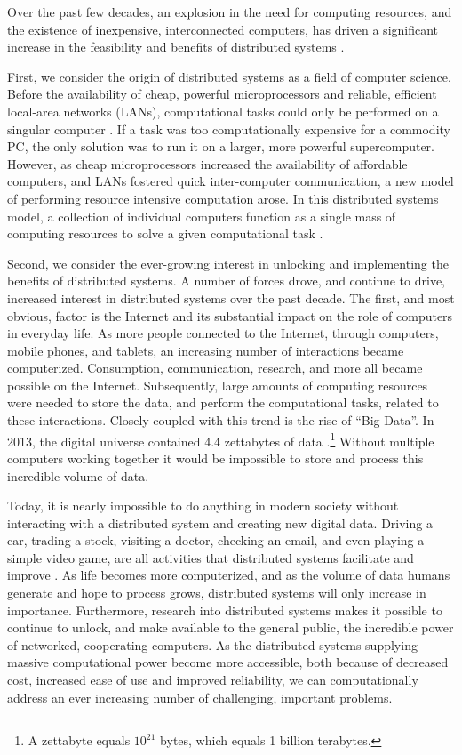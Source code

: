 Over the past few decades, an explosion in the need for computing resources,
and the existence of inexpensive, interconnected computers, has
driven a significant increase in the feasibility and benefits of distributed
systems \cite{distributed-systems-principles-and-paradigms}.

First, we consider the origin of distributed systems as a field of computer
science. Before the availability of cheap, powerful microprocessors and reliable,
efficient local-area networks (LANs), computational tasks could only be
performed on a singular computer
\cite{distributed-systems-principles-and-paradigms}. If a task was too
computationally expensive for a commodity PC, the only solution was to run
it on a larger, more powerful supercomputer. However, as cheap microprocessors
increased the availability of affordable computers, and LANs fostered quick inter-computer
communication, a new
model of performing resource intensive computation arose.
In this distributed systems model, a collection of individual
computers function as a single mass of computing resources
to solve a given computational task
\cite{distributed-systems-principles-and-paradigms}.

Second, we consider the ever-growing interest in unlocking and implementing the
benefits of distributed systems. A number of forces drove, and continue to drive,
increased interest in distributed systems over
the past decade. The first, and most obvious, factor is the Internet and its
substantial impact on the role of computers in everyday life.
As more people connected to the Internet, through computers,
mobile phones, and tablets, an increasing number of interactions became
computerized. Consumption, communication, research, and more all
became possible on the Internet. Subsequently, large amounts of computing resources
were needed to store the data, and perform the computational tasks, related to these
interactions. Closely coupled with this trend is the rise of ``Big Data''.
In 2013, the digital universe contained 4.4 zettabytes of data
\cite{the-digital-universe-of-opportunities}.\footnote{A
  zettabyte equals $10^{21}$ bytes, which equals 1 billion
terabytes.} Without
multiple computers working together it would be impossible to store and process
this incredible volume of data.

Today, it is nearly impossible to do
anything in modern society without interacting with a distributed system and
creating new digital data. Driving a car, trading a stock, visiting a doctor,
checking an email, and even playing a simple video game, are all activities that
distributed systems facilitate and improve \cite{distributed-systems-concepts-and-design}.
As life becomes more
computerized, and as the volume of data humans generate and hope to process
grows, distributed systems will only increase in importance.
Furthermore, research into distributed systems makes it possible to
continue to unlock, and make available to the general public,
the incredible power of networked, cooperating computers. As the distributed systems
supplying massive computational power become more
accessible, both because of decreased cost, increased ease of use and
improved reliability, we can
computationally address an ever increasing number of challenging, important problems.

